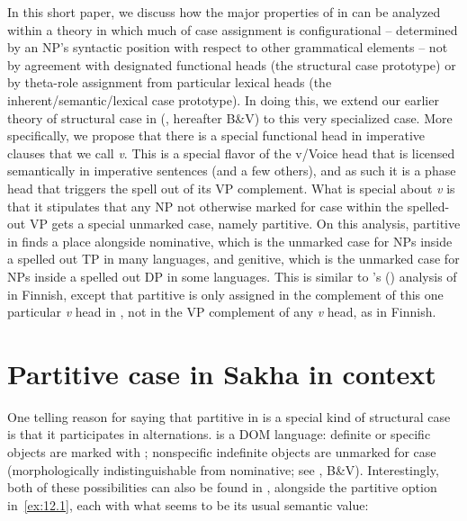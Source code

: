 \documentclass[output=paper]{langsci/langscibook}
\begin{document}
\largerpage[2]
\begin{sloppypar}
In this short paper, we discuss how the major properties of  in  can be analyzed within a theory in which much of case assignment
is configurational -- determined by an NP’s syntactic position with respect to
other grammatical elements -- not by agreement with designated functional heads
(the structural case prototype) or by theta-role assignment from particular
lexical heads (the inherent/semantic/lexical case prototype). In doing this, we
extend our earlier theory of structural case in 
(\citealt{BakVin2010}, hereafter B\&V) to this very specialized case. More
specifically, we propose that there is a special functional head in imperative
clauses that we call \emph{v}\textsubscript{\Imp}. This is a special flavor of
the v/Voice head that is licensed semantically in imperative sentences (and a
few others), and as such it is a phase head that triggers the spell out of its
VP complement. What is special about \emph{v}\textsubscript{\Imp} is that it
stipulates that any NP not otherwise marked for case within the spelled-out VP
gets a special unmarked case, namely partitive. On this analysis, partitive in
 finds a place alongside nominative, which is the unmarked case for
NPs inside a spelled out TP in many languages, and genitive,
which is the unmarked case for NPs inside a spelled out DP in some languages.
This is similar to \citeauthor{Baker2015}'s (\citeyear[140--145]{Baker2015})
analysis of  in Finnish, except that partitive is only
assigned in the complement of this one particular \emph{v} head in ,
not in the VP complement of any \emph{v} head, as in Finnish.
\end{sloppypar}

\section{Partitive case in Sakha in context}
\largerpage[2]

One telling reason for saying that partitive in  is a special kind
of structural case is that it participates in alternations.  is a
\gls{DOM} language: definite or specific objects are marked with
; nonspecific indefinite objects are unmarked for case
(morphologically indistinguishable from nominative; see
\citealt{Vinokurova2005}, B\&V).  Interestingly, both of these possibilities
can also be found in , alongside the partitive option
in~\eqref{ex:12.1}, each with what seems to be its usual semantic value:
\end{document}
